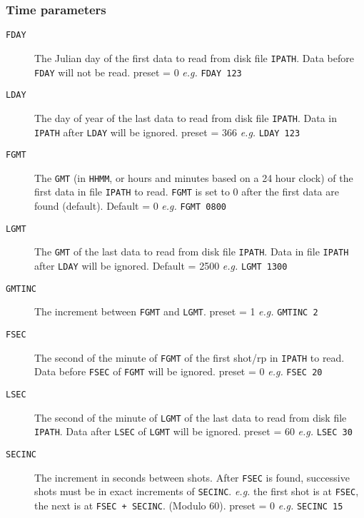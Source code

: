 \subsubsection{Time parameters}

\begin{description}
\item[\texttt{FDAY}] The Julian day of the first data to read from disk file \texttt{IPATH}.  Data before \texttt{FDAY} will not be read.  \Gls{preset} = 0      \textit{e.g.}  \texttt{FDAY 123}

\item[\texttt{LDAY}] The day of year of the last data to read from disk file \texttt{IPATH}.  Data in \texttt{IPATH} after \texttt{LDAY} will be ignored.  \Gls{preset} = 366     \textit{e.g.}  \texttt{LDAY 123}

\item[\texttt{FGMT}] The \texttt{GMT} (in \texttt{HHMM}, or hours and minutes based on a 24 hour clock) of the first data in file \texttt{IPATH} to read.  \texttt{FGMT} is set to 0 after the first data are found (default).  Default = 0    \textit{e.g.}  \texttt{FGMT 0800}

\item[\texttt{LGMT}] The \texttt{GMT} of the last data to read from disk file \texttt{IPATH}.
         Data in file \texttt{IPATH} after \texttt{LDAY} will be ignored.
         Default = 2500     \textit{e.g.}   \texttt{LGMT 1300}

\item[\texttt{GMTINC}] The increment between \texttt{FGMT} and \texttt{LGMT}.
         \Gls{preset} = 1        \textit{e.g.}  \texttt{GMTINC 2}

\item[\texttt{FSEC}]   The second of the minute of \texttt{FGMT} of the first \gls{shot}/\gls{rp} in
         \texttt{IPATH} to read.  Data before \texttt{FSEC} of \texttt{FGMT} will be ignored.
         \Gls{preset} = 0       \textit{e.g.}   \texttt{FSEC 20}

\item[\texttt{LSEC}]   The second of the minute of \texttt{LGMT} of the last data to read
         from disk file \texttt{IPATH}.  Data after \texttt{LSEC} of \texttt{LGMT} will be
         ignored.
         \Gls{preset} = 60     \textit{e.g.}    \texttt{LSEC 30}

\item[\texttt{SECINC}] The increment in seconds between \glspl{shot}.  After \texttt{FSEC} is
         found, successive \glspl{shot} must be in exact increments of
         \texttt{SECINC}.  \textit{e.g.} the first \gls{shot} is at \texttt{FSEC}, the next is at
         \texttt{FSEC + SECINC}.  (Modulo 60).
         \Gls{preset} = 0      \textit{e.g.}     \texttt{SECINC 15}


\end{description}
